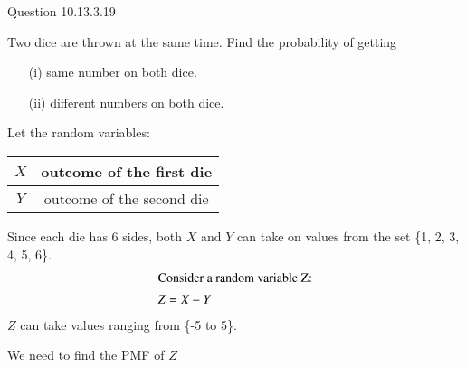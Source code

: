 \documentclass[journal,12pt,twocolumn]{IEEEtran}
\theoremstyle{remark}
\begin{document}
Question 10.13.3.19

Two dice are thrown at the same time. Find the probability of getting
\begin{enumerate}
    \item[(i)] same number on both dice.
    \item[(ii)] different numbers on both dice.
\end{enumerate}
\solution
Let the random variables:
\begin{table}[!ht]
\begin{tabular}{|c|c|}
	\hline
	$X$ & outcome of the first die\\
	\hline
	$Y$ & outcome of the second die\\
	\hline
\end{tabular}
\end{table}

Since each die has 6 sides, both $X$ and $Y$ can take on values from the set \{1, 2, 3, 4, 5, 6\}.
\begin{align}
\intertext{Consider a random variable Z:}
Z &= X-Y
\end{align}
$Z$ can take values ranging from \{-5 to 5\}.

We need to find the PMF of $Z$
\end{document}
